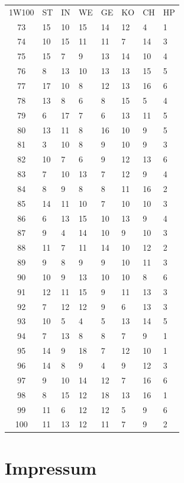 \documentclass[11pt]{wbzine}
\begin{document}
\begin{tabularx}{\textwidth}{cYYYYYYY}
1W100 & ST & IN & WE & GE & KO & CH & HP \\
  73 & 15 & 10 & 15 & 14 & 12 & 4 & 1 \\
  74 & 10 & 15 & 11 & 11 & 7 & 14 & 3 \\ 
  75 & 15 & 7 & 9 & 13 & 14 & 10 & 4 \\ 
  76 & 8 & 13 & 10 & 13 & 13 & 15 & 5 \\ 
  77 & 17 & 10 & 8 & 12 & 13 & 16 & 6 \\ 
  78 & 13 & 8 & 6 & 8 & 15 & 5 & 4 \\
  79 & 6 & 17 & 7 & 6 & 13 & 11 & 5 \\ 
  80 & 13 & 11 & 8 & 16 & 10 & 9 & 5 \\ 
  81 & 3 & 10 & 8 & 9 & 10 & 9 & 3 \\ 
  82 & 10 & 7 & 6 & 9 & 12 & 13 & 6 \\ 
  83 & 7 & 10 & 13 & 7 & 12 & 9 & 4 \\
  84 & 8 & 9 & 8 & 8 & 11 & 16 & 2 \\ 
  85 & 14 & 11 & 10 & 7 & 10 & 10 & 3 \\
  86 & 6 & 13 & 15 & 10 & 13 & 9 & 4 \\
  87 & 9 & 4 & 14 & 10 & 9 & 10 & 3 \\
  88 & 11 & 7 & 11 & 14 & 10 & 12 & 2 \\ 
  89 & 9 & 8 & 9 & 9 & 10 & 11 & 3 \\ 
  90 & 10 & 9 & 13 & 10 & 10 & 8 & 6 \\
  91 & 12 & 11 & 15 & 9 & 11 & 13 & 3 \\
  92 & 7 & 12 & 12 & 9 & 6 & 13 & 3 \\ 
  93 & 10 & 5 & 4 & 5 & 13 & 14 & 5 \\
  94 & 7 & 13 & 8 & 8 & 7 & 9 & 1 \\ 
  95 & 14 & 9 & 18 & 7 & 12 & 10 & 1 \\ 
  96 & 14 & 8 & 9 & 4 & 9 & 12 & 3 \\
  97 & 9 & 10 & 14 & 12 & 7 & 16 & 6 \\ 
  98 & 8 & 15 & 12 & 18 & 13 & 16 & 1 \\
  99 & 11 & 6 & 12 & 12 & 5 & 9 & 6 \\
  100 & 11 & 13 & 12 & 11 & 7 & 9 & 2 \\ 
  \end{tabularx}

\section{Impressum}


\end{document}
